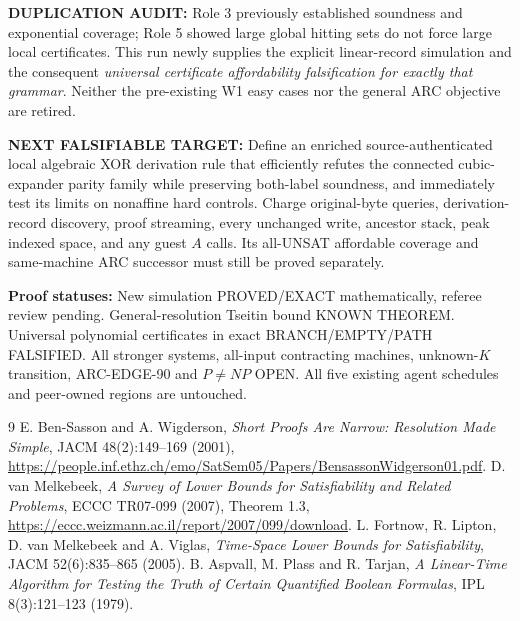 \documentclass[11pt]{article}
\begin{document}
\noindent\textbf{DUPLICATION AUDIT:} Role 3 previously established soundness and exponential coverage; Role 5 showed large global hitting sets do not force large local certificates. This run newly supplies the explicit linear-record simulation and the consequent \emph{universal certificate affordability falsification for exactly that grammar}. Neither the pre-existing W1 easy cases nor the general ARC objective are retired.

\noindent\textbf{NEXT FALSIFIABLE TARGET:} Define an enriched source-authenticated local algebraic XOR derivation rule that efficiently refutes the connected cubic-expander parity family while preserving both-label soundness, and immediately test its limits on nonaffine hard controls. Charge original-byte queries, derivation-record discovery, proof streaming, every unchanged write, ancestor stack, peak indexed space, and any guest \(A\) calls. Its all-UNSAT affordable coverage and same-machine ARC successor must still be proved separately.

\noindent\textbf{Proof statuses:} New simulation PROVED/EXACT mathematically, referee review pending. General-resolution Tseitin bound KNOWN THEOREM. Universal polynomial certificates in exact BRANCH/EMPTY/PATH FALSIFIED. All stronger systems, all-input contracting machines, unknown-\(K\) transition, ARC-EDGE-90 and \(P\ne NP\) OPEN. All five existing agent schedules and peer-owned regions are untouched.

\begin{thebibliography}{9}
 E. Ben-Sasson and A. Wigderson, \emph{Short Proofs Are Narrow: Resolution Made Simple}, JACM 48(2):149--169 (2001), \url{https://people.inf.ethz.ch/emo/SatSem05/Papers/BensassonWidgerson01.pdf}.
 D. van Melkebeek, \emph{A Survey of Lower Bounds for Satisfiability and Related Problems}, ECCC TR07-099 (2007), Theorem 1.3, \url{https://eccc.weizmann.ac.il/report/2007/099/download}.
 L. Fortnow, R. Lipton, D. van Melkebeek and A. Viglas, \emph{Time-Space Lower Bounds for Satisfiability}, JACM 52(6):835--865 (2005).
 B. Aspvall, M. Plass and R. Tarjan, \emph{A Linear-Time Algorithm for Testing the Truth of Certain Quantified Boolean Formulas}, IPL 8(3):121--123 (1979).
\end{thebibliography}
\end{document}
